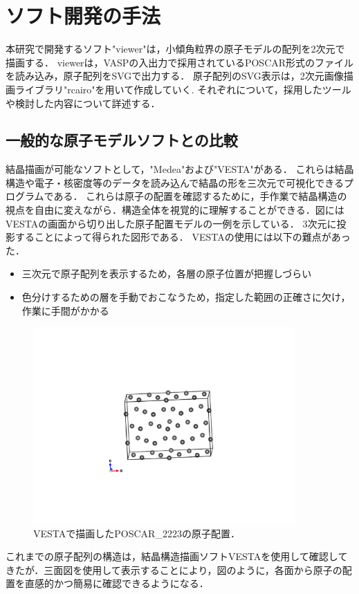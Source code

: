 
\section{ソフト開発の手法}
本研究で開発するソフト"viewer"は，小傾角粒界の原子モデルの配列を2次元で描画する．
viewerは，VASPの入出力で採用されているPOSCAR形式のファイルを読み込み，原子配列をSVGで出力する．
原子配列のSVG表示は，2次元画像描画ライブラリ"rcairo"を用いて作成していく.
それぞれについて，採用したツールや検討した内容について詳述する．

\subsection{一般的な原子モデルソフトとの比較}
結晶描画が可能なソフトとして，"Medea"および"VESTA"がある．
これらは結晶構造や電子・核密度等のデータを読み込んで結晶の形を三次元で可視化できるプログラムである\cite{Vesta}．
これらは原子の配置を確認するために，手作業で結晶構造の視点を自由に変えながら．構造全体を視覚的に理解することができる．図にはVESTAの画面から切り出した原子配置モデルの一例を示している．
3次元に投影することによって得られた図形である．
VESTAの使用には以下の難点があった．

\begin{itemize}
\item 三次元で原子配列を表示するため，各層の原子位置が把握しづらい
\item 色分けするための層を手動でおこなうため，指定した範囲の正確さに欠け，作業に手間がかかる
\end{itemize}
\begin{figure}[htbp]\begin{center}
\includegraphics[width=10cm,bb= 0 0 737 553]{../figs/./boundary_narita.006.jpeg}
\caption{VESTAで描画したPOSCAR\_2223の原子配置．}
\label{default}\end{center}\end{figure}
これまでの原子配列の構造は，結晶構造描画ソフトVESTAを使用して確認してきたが．三面図を使用して表示することにより，図のように，各面から原子の配置を直感的かつ簡易に確認できるようになる．

